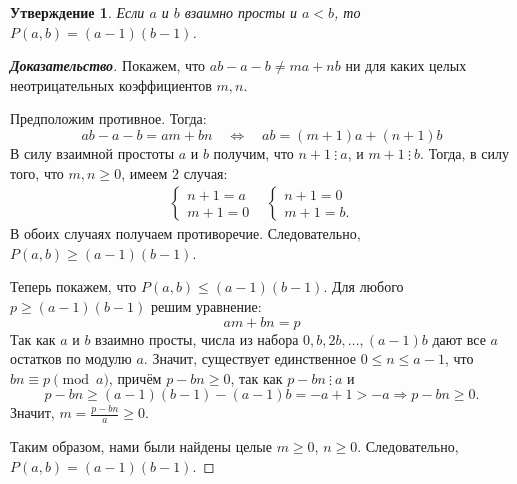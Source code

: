 \documentclass[12pt]{article}
\newtheorem{proposition}[theorem]{Утверждение}
\theoremstyle{definition}
\begin{document}
\begin{proposition}
Если $a$ и $b$ взаимно просты и $a < b$, то $P(a, b) = (a - 1)(b - 1)$.
\end{proposition}
\begin{proof}[\textbf{Доказательство}]
Покажем, что $ab - a - b \ne ma + nb$ ни для каких целых неотрицательных коэффициентов $m, n$.

Предположим противное. Тогда: \begin{equation*}
ab - a - b = am + bn \quad \Longleftrightarrow \quad ab = (m + 1)a + (n + 1) b
\end{equation*}
В силу взаимной простоты $a$ и $b$ получим, что $n + 1 \ \vdots \ a$, и $m + 1 \ \vdots \ b$. Тогда, в силу того, что $m, n \ge 0$, имеем $2$ случая:\begin{align*}
     \begin{cases}
        n + 1 = a\\
        m + 1 = 0
    \end{cases}
    &
    \begin{cases}
        n + 1 = 0\\
        m + 1 = b.
    \end{cases}
\end{align*}
В обоих случаях получаем противоречие. Следовательно, $P(a, b) \ge (a - 1)(b - 1)$.

Теперь покажем, что $P(a, b) \le (a - 1)(b - 1)$. Для любого $p \ge (a - 1)(b - 1)$ решим уравнение: \begin{equation*}
am + bn = p
\end{equation*}
Так как $a$ и $b$ взаимно просты, числа из набора $0, b, 2b, \dots, (a - 1)b$ дают все $a$ остатков по модулю $a$. Значит, существует единственное $0 \le n \le a - 1$, что $bn \equiv p \pmod a$, причём $p - bn \ge 0$, так как $p - bn \ \vdots \ a$ и
\begin{equation*}
p - bn \ge (a - 1)(b - 1) - (a - 1)b = -a + 1 > -a \Longrightarrow p - bn \ge 0.
\end{equation*}
Значит, $m = \frac{p - bn}{a} \ge 0$.

Таким образом, нами были найдены целые $m \ge 0$, $n \ge 0$. Следовательно, $P(a, b) = (a - 1)(b - 1)$.
\end{proof}
\end{document}
